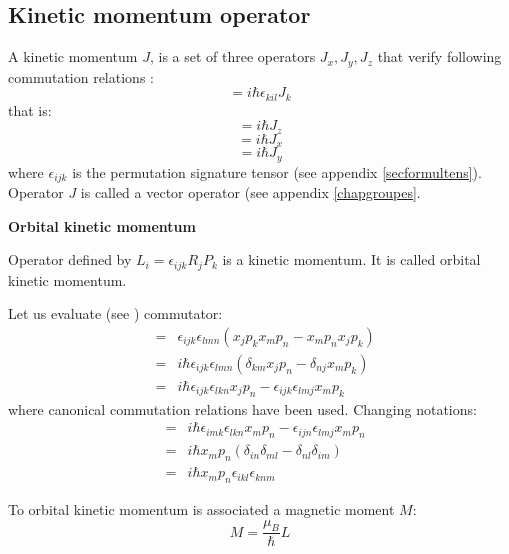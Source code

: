 \documentclass[12pt]{book}
\begin{document}
\subsection{Kinetic momentum operator}
\begin{defn}
A kinetic momentum 
$J$, is a set of three operators
$J_x,J_y,J_z$ that verify following commutation relations
:
\begin{equation}
[J_i,J_l]=i\hbar\epsilon_{kil}J_k
\end{equation}
that is:
\begin{equation}
[J_x,J_y]=i\hbar J_z
\end{equation}
\begin{equation}
[J_y,J_z]=i\hbar J_x
\end{equation}
\begin{equation}
[J_z,J_x]=i\hbar J_y
\end{equation}
where $\epsilon_{ijk}$ is the permutation signature tensor (see appendix
\ref{secformultens}). Operator $J$ is called a vector operator (see
appendix \ref{chapgroupes}.
\end{defn}
\begin{exmp}
{\bf Orbital kinetic momentum}
\begin{thm}
Operator defined by $L_i=\epsilon_{ijk}R_jP_k$ is a kinetic momentum. It is
called orbital kinetic momentum.
\end{thm}
\begin{pf}
Let us evaluate (see \cite{ph:mecaq:Bohm93}) commutator:
\begin{eqnarray}
[L_i,L_l]&=&\epsilon_{ijk}\epsilon_{lmn}(x_jp_kx_mp_n-x_mp_nx_jp_k)\\
&=&i\hbar
\epsilon_{ijk}\epsilon_{lmn}(\delta_{km}x_jp_n-\delta_{nj}x_mp_k)\\ 
&=&i\hbar \epsilon_{ijk}\epsilon_{lkn}x_jp_n -
\epsilon_{ijk}\epsilon_{lmj}x_mp_k 
\end{eqnarray}
where canonical commutation relations have been used. Changing notations:
\begin{eqnarray}
[L_i,L_l]&=&i\hbar \epsilon_{imk}\epsilon_{lkn}x_mp_n -
\epsilon_{ijn}\epsilon_{lmj}x_mp_n\\
&=&i\hbar x_mp_n(\delta_{in}\delta_{ml}-\delta_{nl}\delta_{im})\\
&=&i\hbar x_mp_n\epsilon_{ikl}\epsilon_{knm}
\end{eqnarray}
\end{pf}
\begin{postulat}
To orbital kinetic momentum is associated a magnetic moment $M$:
\begin{equation}
M=\frac{\mu_B}{\hbar}L
\end{equation}
\end{postulat}
\end{exmp}
\end{document}
